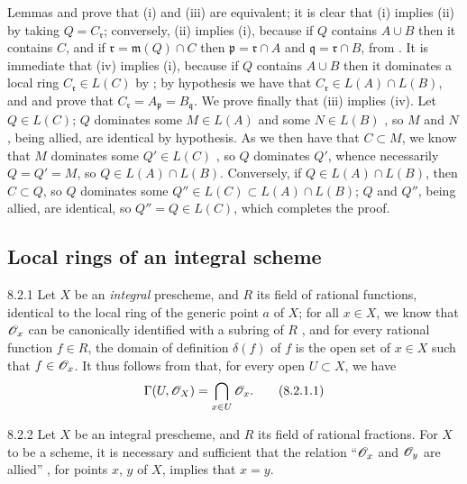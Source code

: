 Lemmas  and  prove that (i) and (iii) are equivalent; it
is clear that (i) implies (ii) by taking $Q=C_\mathfrak{r}$; conversely, (ii)
implies (i), because if $Q$ contains $A\cup B$ then it contains $C$, and if
$\mathfrak{r}=\mathfrak{m}(Q)\cap C$ then $\mathfrak{p}=\mathfrak{r}\cap A$ and
$\mathfrak{q}=\mathfrak{r}\cap B$, from . It is immediate that (iv)
implies (i), because if $Q$ contains $A\cup B$ then it dominates a local ring
$C_\mathfrak{r}\in L(C)$ by ; by hypothesis we have that
$C_\mathfrak{r}\in L(A)\cap L(B)$, and  and  prove that
$C_\mathfrak{r}=A_\mathfrak{p}=B_\mathfrak{q}$. We prove finally that (iii)
implies (iv). Let $Q\in L(C)$; $Q$ dominates some $M\in L(A)$ and some $N\in
L(B)$ , so $M$ and $N$, being allied, are identical by hypothesis.
As we then have that $C\subset M$, we know that $M$ dominates some $Q'\in L(C)$
, so $Q$ dominates $Q'$, whence necessarily  $Q=Q'=M$,
so $Q\in L(A)\cap L(B)$. Conversely, if $Q\in L(A)\cap L(B)$, then $C\subset
Q$, so  $Q$ dominates some $Q''\in L(C)\subset L(A)\cap L(B)$; $Q$
and $Q''$, being allied, are identical, so $Q''=Q\in L(C)$, which completes the
proof.

\subsection{Local rings of an integral scheme}
\label{1-schemes-8.2}

\begin{env}{8.2.1}
\label{env-1.8.2.1}
Let $X$ be an \emph{integral} prescheme, and $R$ its field of
rational functions, identical to the local ring of the generic point $a$ of $X$;
for all $x\in X$, we know that $\mathscr{O}_x$ can be canonically identified with a
subring of $R$ , and for every rational function $f\in R$, the
domain of definition $\delta(f)$ of $f$ is the open set of $x\in X$ such that
$f\in\mathscr{O}_x$. It thus follows from  that, for every open $U\subset X$,
we have
\[
  \Gamma(U,\mathscr{O}_X)=\bigcap_{x\in U}\mathscr{O}_x.
  \tag{8.2.1.1}
\]
\end{env}

\begin{envs}[Proposition]{8.2.2}
\label{prop-1.8.2.2}
Let $X$ be an integral prescheme,
and $R$ its field of rational fractions. For $X$ to be a scheme, it is
necessary and sufficient that the relation ``$\mathscr{O}_x$ and $\mathscr{O}_y$ are allied''
, for points $x$, $y$ of $X$, implies that $x=y$.
\end{envs}

